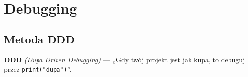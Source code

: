 \chapter{Debugging}
\section{Metoda DDD}

\textbf{DDD} \textsl{(Dupa Driven Debugging)} --- ,,Gdy twój projekt jest jak kupa, to debuguj przez \verb|print("dupa")|''.